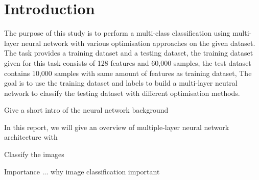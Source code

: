 \section{Introduction\label{chapter1}}
The purpose of this study is to perform a multi-class classification using multi-layer neural network with various optimisation approaches on the given dataset.
The task provides a training dataset and a testing dataset,
the training dataset given for this task consists of 128 features and 60,000 samples,
the test dataset contains 10,000 samples with same amount of features as training dataset,
The goal is to use the training dataset and labels to build a multi-layer neutral network to classify the testing dataset with different optimisation methods.

Give a short intro of the neural network background

In this report, we will give an overview of multiple-layer neural network architecture with 


Classify the images

Importance ... why image classification important



